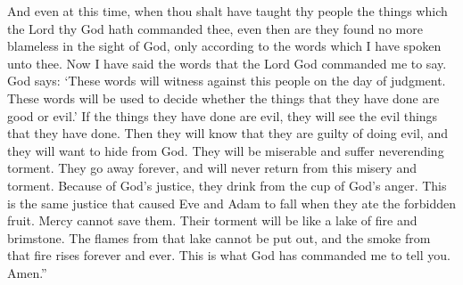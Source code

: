 And even at this time, when thou shalt have taught thy people the things which the Lord thy God hath commanded thee, even then are they found no more blameless in the sight of God, only according to the words which I have spoken unto thee.
\bverse \iffalse And now I have spoken the words which the Lord God hath commanded me. \fi
Now I have said the words that the Lord God commanded me to say.
\bverse \iffalse And thus saith the Lord: They shall stand as a bright testimony against this people, at the judgment day; whereof they shall be judged, every man according to his works, whether they be good, or whether they be evil. \fi
God says: \lq These words will witness against this people on the day of judgment. These words will be used to decide whether the things that they have done are good or evil.\rq
\bverse \iffalse And if they be evil they are consigned to an awful view of their own guilt and abominations, which doth cause them to shrink from the presence of the Lord into a state of misery and endless torment, from whence they can no more return; therefore they have drunk damnation to their own souls. \fi
If the things they have done are evil, they will see the evil things that they have done. Then they will know that they are guilty of doing evil, and they will want to hide from God. They will be miserable and suffer neverending torment. They go away forever, and will never return from this misery and torment. 
\bverse \iffalse Therefore, they have drunk out of the cup of the wrath of God, which justice could no more deny unto them than it could deny that Adam should fall because of his partaking of the forbidden fruit; therefore, mercy could have claim on them no more forever. \fi
Because of God's justice, they drink from the cup of God's anger. This is the same justice that caused Eve and Adam to fall when they ate the forbidden fruit. Mercy cannot save them.
\bverse \iffalse And their torment is as a lake of fire and brimstone, whose flames are unquenchable, and whose smoke ascendeth up forever and ever. Thus hath the Lord commanded me. Amen. \fi
Their torment will be like a lake of fire and brimstone. The flames from that lake cannot be put out, and the smoke from that fire rises forever and ever. This is what God has commanded me to tell you. Amen.''

